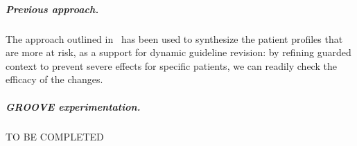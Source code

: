 \subparagraph*{Previous approach.}
The approach outlined in~\cite{DBLP:conf/cmsb/BowlesBBFGM24} has been used to synthesize the patient profiles that are more at risk, as a support for dynamic guideline revision: by refining guarded context to prevent severe effects for specific patients, we can readily check the efficacy of the changes.

\subparagraph*{GROOVE experimentation.}
TO BE COMPLETED




